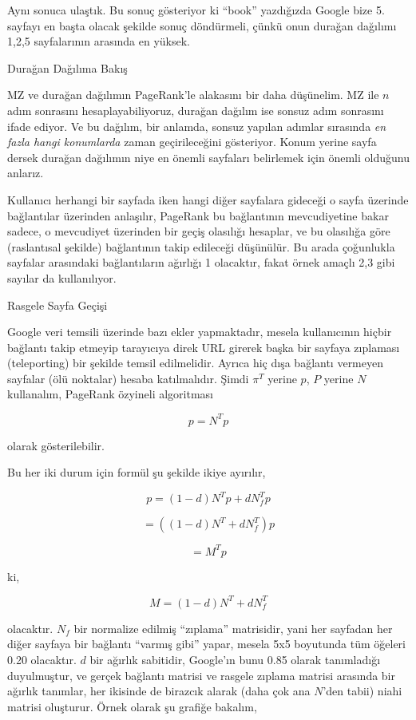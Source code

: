 \documentclass[12pt,fleqn]{article}\usepackage{../../common}
\begin{document}
Aynı sonuca ulaştık. Bu sonuç gösteriyor ki ``book'' yazdığızda Google bize
5. sayfayı en başta olacak şekilde sonuç döndürmeli, çünkü onun durağan
dağılımı 1,2,5 sayfalarının arasında en yüksek.

Durağan Dağılıma Bakış

MZ ve durağan dağılımın PageRank'le alakasını bir daha düşünelim. MZ ile
$n$ adım sonrasını hesaplayabiliyoruz, durağan dağılım ise sonsuz adım
sonrasını ifade ediyor. Ve bu dağılım, bir anlamda, sonsuz yapılan adımlar
sırasında {\em en fazla hangi konumlarda} zaman geçirileceğini
gösteriyor. Konum yerine sayfa dersek durağan dağılımın niye en önemli
sayfaları belirlemek için önemli olduğunu anlarız. 

Kullanıcı herhangi bir sayfada iken hangi diğer sayfalara gideceği o sayfa
üzerinde bağlantılar üzerinden anlaşılır, PageRank bu bağlantının
mevcudiyetine bakar sadece, o mevcudiyet üzerinden bir geçiş olasılığı
hesaplar, ve bu olasılığa göre (raslantısal şekilde) bağlantının takip
edileceği düşünülür. Bu arada çoğunlukla sayfalar arasındaki bağlantıların
ağırlığı 1 olacaktır, fakat örnek amaçlı 2,3 gibi sayılar da kullanılıyor. 

Rasgele Sayfa Geçişi

Google veri temsili üzerinde bazı ekler yapmaktadır, mesela kullanıcının
hiçbir bağlantı takip etmeyip tarayıcıya direk URL girerek başka bir
sayfaya zıplaması (teleporting) bir şekilde temsil edilmelidir. Ayrıca hiç
dışa bağlantı vermeyen sayfalar (ölü noktalar) hesaba katılmalıdır. Şimdi
$\pi^T$ yerine $p$, $P$ yerine $N$ kullanalım, PageRank özyineli
algoritması

$$ p = N^Tp $$ 

olarak gösterilebilir. 

Bu her iki durum için formül şu şekilde ikiye ayırılır,

$$ p = (1-d)N^Tp + dN_f^Tp $$

$$ = ((1-d)N^T + dN_f^T) p $$

$$ = M^Tp $$

ki,

$$M = (1-d)N^T + dN_f^T$$ 

olacaktır. $N_f$ bir normalize edilmiş ``zıplama'' matrisidir, yani her
sayfadan her diğer sayfaya bir bağlantı ``varmış gibi'' yapar, mesela 5x5
boyutunda tüm öğeleri 0.20 olacaktır. $d$ bir ağırlık sabitidir, Google'ın
bunu 0.85 olarak tanımladığı duyulmuştur, ve gerçek bağlantı matrisi ve
rasgele zıplama matrisi arasında bir ağırlık tanımlar, her ikisinde de
birazcık alarak (daha çok ana $N$'den tabii) niahi matrisi oluşturur. Örnek
olarak şu grafiğe bakalım, 
\end{document}
